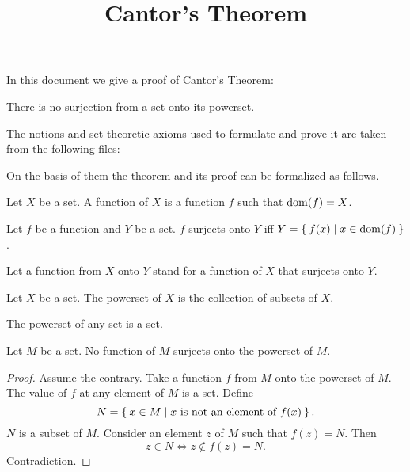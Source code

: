 \documentclass{article}
\title{Cantor's Theorem}
\author{}
\date{}
\begin{document}

  \maketitle

  In this document we give a proof of Cantor's Theorem:

  \begin{quotedtheorem}
    There is no surjection from a set onto its powerset.
  \end{quotedtheorem}

  The notions and set-theoretic axioms used to formulate and prove it are
  taken from the following files:

  \begin{forthel}
  \end{forthel}

  On the basis of them the theorem and its proof can be formalized as follows.

  \begin{forthel}
    \begin{definition}
      Let $X$ be a set.
      A function of $X$ is a function $f$ such that $\operatorname{dom}(f) = X$.
    \end{definition}

    \begin{definition}
      Let $f$ be a function and $Y$ be a set.
      $f$ surjects onto $Y$ iff $Y = \Set{f(x) | x \in \operatorname{dom}(f)}$.
    \end{definition}

    Let a function from $X$ onto $Y$ stand for a function of $X$ that surjects onto $Y$.

    \begin{definition}
      Let $X$ be a set.
      The powerset of $X$ is the collection of subsets of $X$.
    \end{definition}

    \begin{axiom}
      The powerset of any set is a set.
    \end{axiom}


    \begin{theorem}[Cantor]
      Let $M$ be a set.
      No function of $M$ surjects onto the powerset of $M$.
    \end{theorem}
    \begin{proof}
      Assume the contrary.
      Take a function $f$ from $M$ onto the powerset of $M$.
      The value of $f$ at any element of $M$ is a set.
      Define \[ N = \Set{x \in M | \text{$x$ is not an element of $f(x)$}}. \]
      $N$ is a subset of $M$.
      Consider an element $z$ of $M$ such that $f(z) = N$.
      Then \[ z \in N \iff z \notin f(z) = N. \]
      Contradiction.
    \end{proof}
  \end{forthel}
\end{document}
